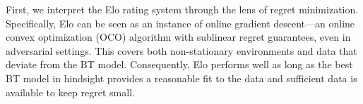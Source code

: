 

First, we interpret the Elo rating system through the lens of regret minimization. Specifically, Elo can be seen as an instance of online gradient descent---an online convex optimization (OCO) algorithm with sublinear regret guarantees, even in adversarial settings. This covers both non-stationary environments and data that deviate from the BT model. Consequently, Elo performs well as long as the best BT model in hindsight provides a reasonable fit to the data and sufficient data is available to keep regret small.


